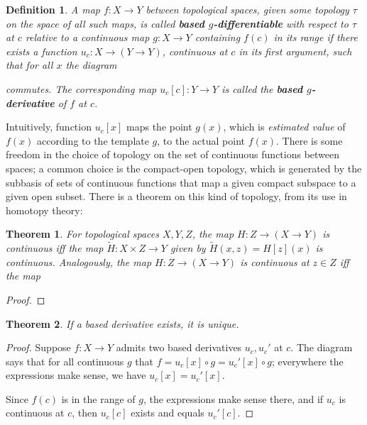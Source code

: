 \documentclass{article}
\newtheorem{thm}{Theorem}
\newtheorem*{define}{Definition}
\begin{document}
\begin{define}
  A map $f: X\to Y$ between topological spaces, given some topology $\tau$ on the space of all such maps,
  is called \textbf{based $g$-differentiable} with respect to $\tau$ at $c$ relative to a continuous map $g: X \to Y$
  containing $f(c)$ in its range if there exists a function $u_{c}: X \to (Y \to Y)$, continuous at $c$ in its first argument,
  such that for all $x$ the diagram
  \begin{center}
  \end{center}
  commutes.
  The corresponding map $u_{c}[c]: Y \to Y$ is called the \textbf{based $g$-derivative} of $f$ at $c$.
\end{define}

Intuitively, function $u_c[x]$ maps the point $g(x)$, which is \textit{estimated value} of $f(x)$ according to the template $g$, to the actual point $f(x)$.
There is some freedom in the choice of topology on the set of continuous functions between spaces; a common choice is the compact-open topology,
which is generated by the subbasis of sets of continuous functions that map a given compact subspace to a given open subset.
There is a theorem on this kind of topology, from its use in homotopy theory:

\begin{thm}
  For topological spaces $X, Y, Z$, the map $H: Z \to (X \to Y)$ is continuous iff the map $\tilde{H}: X \times Z \to Y$
  given by $\tilde{H}(x, z) = H[z](x)$ is continuous.
  Analogously, the map $H: Z \to (X \to Y)$ is continuous at $z \in Z$ iff the map %
\end{thm}

\begin{proof}

\end{proof}

\begin{thm}
  If a based derivative exists, it is unique.
\end{thm}

\begin{proof}
  Suppose $f: X \to Y$ admits two based derivatives $u_{c}, u_{c}'$ at $c$.
  The diagram says that for all continuous $g$ that $f = u_{c}[x] \circ g = u_{c}'[x] \circ g$;
  everywhere the expressions make sense, we have $u_{c}[x] = u_{c}'[x]$.

  Since $f(c)$ is in the range of $g$, the expressions make sense there, and if $u_{c}$ is continuous at $c$,
  then $u_{c}[c]$ exists and equals $u_{c}'[c]$.
\end{proof}
\end{document}
